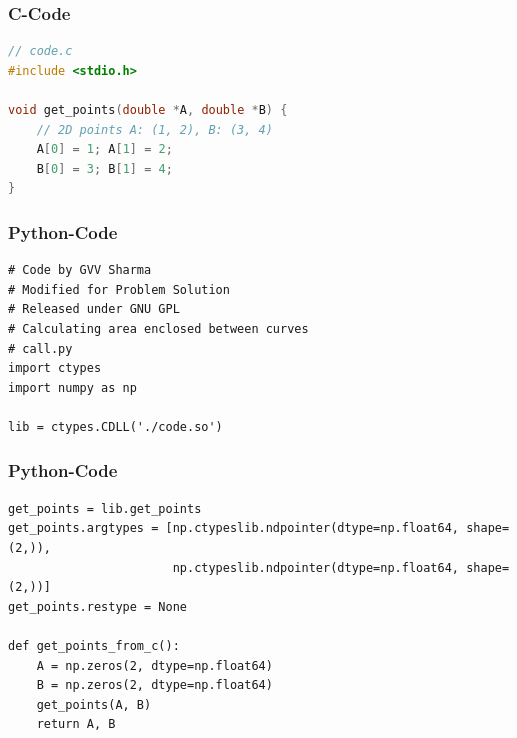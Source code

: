 \documentclass{beamer}
\begin{document}
\begin{frame}[fragile]
\frametitle{C-Code}
\begin{lstlisting}[language=C]
// code.c
#include <stdio.h>

void get_points(double *A, double *B) {
    // 2D points A: (1, 2), B: (3, 4)
    A[0] = 1; A[1] = 2;
    B[0] = 3; B[1] = 4;
}
\end{lstlisting}
\end{frame}
\begin{frame}[fragile]
\frametitle{Python-Code}
\begin{lstlisting}
# Code by GVV Sharma
# Modified for Problem Solution
# Released under GNU GPL
# Calculating area enclosed between curves
# call.py
import ctypes
import numpy as np

lib = ctypes.CDLL('./code.so')
\end{lstlisting}
\end{frame}
\begin{frame}[fragile]
\frametitle{Python-Code}
\begin{lstlisting}
get_points = lib.get_points
get_points.argtypes = [np.ctypeslib.ndpointer(dtype=np.float64, shape=(2,)),
                       np.ctypeslib.ndpointer(dtype=np.float64, shape=(2,))]
get_points.restype = None

def get_points_from_c():
    A = np.zeros(2, dtype=np.float64)
    B = np.zeros(2, dtype=np.float64)
    get_points(A, B)
    return A, B
\end{lstlisting}
\end{frame}
\end{document}
